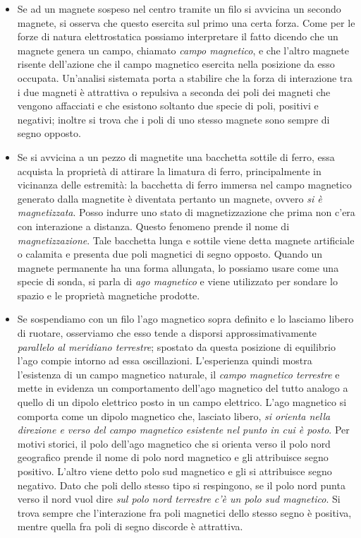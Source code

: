 \begin{itemize}
	\item Se ad un magnete sospeso nel centro tramite un filo si avvicina un secondo magnete, si osserva che questo esercita sul primo una certa forza. Come per le forze di natura elettrostatica possiamo interpretare il fatto dicendo che un magnete genera un campo, chiamato \emph{campo magnetico}, e che l'altro magnete risente dell'azione che il campo magnetico esercita nella posizione da esso occupata. Un'analisi sistemata porta a stabilire che la forza di interazione tra i due magneti è attrattiva o repulsiva a seconda dei poli dei magneti che vengono affacciati e che esistono soltanto due specie di poli, positivi e negativi; inoltre si trova che i poli di uno stesso magnete sono sempre di segno opposto.
	\item Se si avvicina a un pezzo di magnetite una bacchetta sottile di ferro, essa acquista la proprietà di attirare la limatura di ferro, principalmente in vicinanza delle estremità: la bacchetta di ferro immersa nel campo magnetico generato dalla magnetite è diventata pertanto un magnete, ovvero \emph{si è magnetizzata}. Posso indurre uno stato di magnetizzazione che prima non c'era con interazione a distanza. Questo fenomeno prende il nome di \emph{magnetizzazione}. Tale bacchetta lunga e sottile viene detta magnete artificiale o calamita e presenta due poli magnetici di segno opposto. Quando un magnete permanente ha una forma allungata, lo possiamo usare come una specie di sonda, si parla di \emph{ago magnetico} e viene utilizzato per sondare lo spazio e le proprietà magnetiche prodotte.
	\item Se sospendiamo con un filo l'ago magnetico sopra definito e lo lasciamo libero di ruotare, osserviamo che esso tende a disporsi approssimativamente \emph{parallelo al meridiano terrestre}; spostato da questa posizione di equilibrio l'ago compie intorno ad essa oscillazioni. L'esperienza quindi mostra l'esistenza di un campo magnetico naturale, il \emph{campo magnetico terrestre} e mette in evidenza un comportamento dell'ago magnetico del tutto analogo a quello di un dipolo elettrico posto in un campo elettrico. L'ago magnetico si comporta come un dipolo magnetico che, lasciato libero, \emph{si orienta nella direzione e verso del campo magnetico esistente nel punto in cui è posto}. Per motivi storici, il polo dell'ago magnetico che si orienta verso il polo nord geografico prende il nome di polo nord magnetico e gli attribuisce segno positivo. L'altro viene detto polo sud magnetico e gli si attribuisce segno negativo. Dato che poli dello stesso tipo si respingono, se il polo nord punta verso il nord vuol dire \emph{sul polo nord terrestre c'è un polo sud magnetico}. Si trova sempre che l'interazione fra poli magnetici dello stesso segno è positiva, mentre quella fra poli di segno discorde è attrattiva.

\end{itemize}
